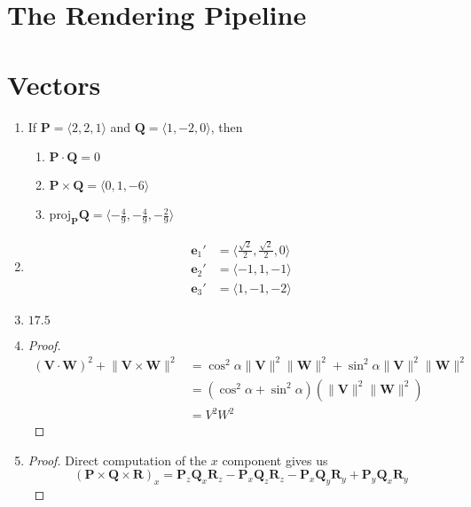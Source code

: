 \documentclass[a4paper]{report}
\newcommand{\vect}{\mathbf}
\begin{document}
\chapter{The Rendering Pipeline}

\chapter{Vectors}
\begin{enumerate}
	\item If $\vect{P} = \langle 2,2,1 \rangle$ and $\vect{Q} = \langle 1,-2,0 \rangle$, then
	\begin{enumerate}
		\item $\vect{P} \cdot \vect{Q} = 0$
		\item $\vect{P} \times \vect{Q} = \langle 0,1,-6 \rangle$
		\item ${\text{proj}}_{\vect{P}}\vect{Q} = \langle -\frac{4}{9}, -\frac{4}{9}, -\frac{2}{9} \rangle$
	\end{enumerate}
	\item
		\begin{align}
			\mathbf{e}_1' &= \langle \frac{\sqrt{2}}{2}, \frac{\sqrt{2}}{2}, 0 \rangle\\
			\mathbf{e}_2' &= \langle -1, 1, -1 \rangle\\
			\mathbf{e}_3' &= \langle 1, -1, -2 \rangle
		\end{align}
	\item $17.5$
	\item
		\begin{proof}
			\begin{align*}
				(\vect{V} \cdot \vect{W})^2 + \lVert \vect{V} \times \vect{W} \rVert^2
				&= \cos^2 \alpha \lVert \vect{V} \rVert^2 \lVert \vect{W} \rVert^2
				+ \sin^2 \alpha \lVert \vect{V} \rVert^2 \lVert \vect{W} \rVert^2\\
				&= (\cos^2 \alpha + \sin^2 \alpha)(\lVert \vect{V} \rVert^2 \lVert \vect{W} \rVert^2)\\
				&= V^2W^2
			\end{align*}
		\end{proof}
	\item
		\begin{proof}
			Direct computation of the $x$ component gives us
			\begin{equation*}
				(\vect{P} \times \vect{Q} \times \vect{R})_x = \vect{P}_z \vect{Q}_x \vect{R}_z - \vect{P}_x \vect{Q}_z \vect{R}_z - \vect{P}_x \vect{Q}_y \vect{R}_y + \vect{P}_y \vect{Q}_x \vect{R}_y

\end{equation*}
\end{proof}
\end{enumerate}
\end{document}
